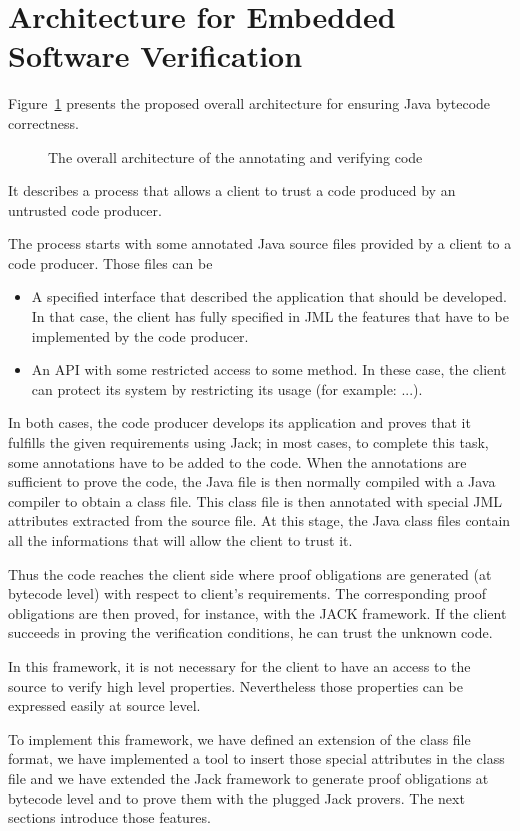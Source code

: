 \section{Architecture for Embedded Software Verification}
\label{architecture_s}	
Figure~\ref{architecture} presents the proposed overall architecture for ensuring Java bytecode correctness. 
\begin{figure}[ht!]
\begin{center}
\caption{The overall architecture of the annotating and verifying code}
\label{architecture}
\end{center}
\end{figure}
It describes a process that allows a client to trust a code produced by an untrusted code producer.

The process starts with some annotated Java source files provided by a client to a code producer. Those files can be
\begin{itemize}
\item A specified interface that described the application that should be developed. In that case, the client has fully specified in JML the features that have to be implemented by the code producer.
\item An API with some restricted access to some method. In these case, the client can protect its system by restricting its usage (for example: ...). 
\end{itemize}
In both cases, the code producer develops its application and proves that it fulfills the given requirements using Jack; 
in most cases, to complete this task, some annotations have to be added to the code.
When the annotations are sufficient to prove the code, the Java file is then normally compiled with a Java compiler to obtain a 
class file. 
This class file is then annotated with special JML attributes extracted from the source file. 
At this stage, the Java class files contain all the informations that will allow the client to trust it.

Thus the code reaches the client side where proof obligations are generated (at bytecode level) with respect to client's requirements. 
The corresponding proof obligations are then proved, for instance, with the JACK framework. If the client succeeds in proving 
the verification conditions, he can trust the unknown code. 

In this framework, it is not necessary for the client to have an access to the source to verify high level properties. 
Nevertheless those properties can be expressed easily at source level.

To implement this framework, we have defined an extension of the class file format, we have implemented a tool to insert 
those special attributes in the class file and we have extended the Jack framework to generate proof obligations at bytecode level and to prove them with the plugged Jack provers. The next sections introduce those features.  

